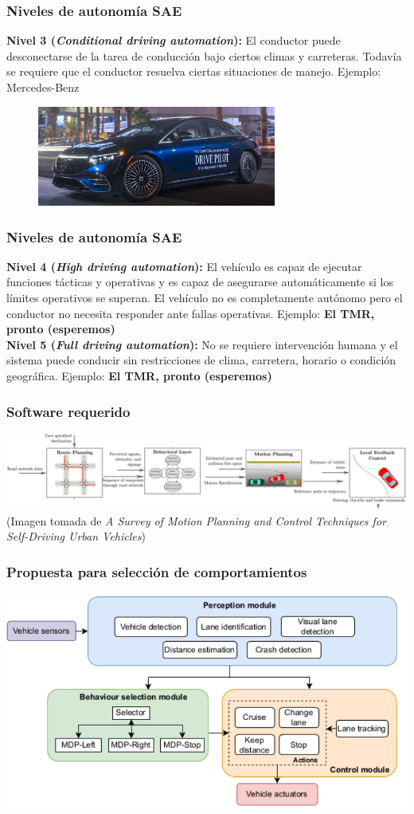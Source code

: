 \begin{frame}\frametitle{Niveles de autonomía SAE}
  \textbf{Nivel 3 (\textit{Conditional driving automation}):} El conductor puede desconectarse de la tarea de conducción bajo ciertos climas y carreteras. Todavía se requiere que el conductor resuelva ciertas situaciones de manejo. Ejemplo: Mercedes-Benz
  \begin{figure}
    \centering
    \includegraphics[width=0.7\textwidth]{Figuras/EjemploSAE3.png}
  \end{figure}
\end{frame}

\begin{frame}\frametitle{Niveles de autonomía SAE}
  \textbf{Nivel 4 (\textit{High driving automation}):} El vehículo es capaz de ejecutar funciones tácticas y operativas y es capaz de asegurarse automáticamente si los límites operativos se superan. El vehículo no es completamente autónomo pero el conductor no necesita responder ante fallas operativas. Ejemplo: \textbf{El TMR, pronto (esperemos)}
  \[\]
  \textbf{Nivel 5 (\textit{Full driving automation}):} No se requiere intervención humana y el sistema puede conducir sin restricciones de clima, carretera, horario o condición geográfica.  Ejemplo: \textbf{El TMR, pronto (esperemos)}
\end{frame}

\begin{frame}\frametitle{Software requerido}
  \includegraphics[width=\textwidth]{Figuras/SoftwareArchitecture.png}
  (Imagen tomada de \textit{A Survey of Motion Planning and Control Techniques for Self-Driving Urban Vehicles})
\end{frame}

\begin{frame}\frametitle{Propuesta para selección de comportamientos}
  \includegraphics[width=\textwidth]{Figuras/GeneralArchitecture.pdf}
\end{frame}